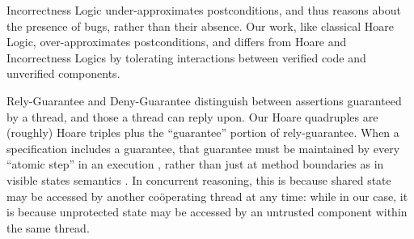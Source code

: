  Incorrectness Logic
\cite{IncorrectnessLogic}
under-approximates  postconditions, and thus
reasons about the presence of bugs, rather than their absence.
%
Our work, like classical Hoare Logic, over-approximates postconditions,
 and differs from Hoare and Incorrectness Logics
by tolerating interactions between verified code and unverified components.

Rely-Guarantee
\cite{relyGuarantee-HayesJones-setss2017,relyGuarantee-vanStaden-mpc2015}
and Deny-Guarantee \cite{DenyGuarantee} %
distinguish between assertions guaranteed by a thread, and those a
thread can reply upon. 
Our Hoare quadruples are (roughly) Hoare triples plus 
the ``guarantee'' portion of rely-guarantee.
When a
specification includes a guarantee, that guarantee must be maintained
by every ``atomic step'' in an execution
\cite{relyGuarantee-HayesJones-setss2017}, rather than just at method
boundaries as in visible states semantics
\cite{MuellerPoetzsch-HeffterLeavens06,DrossoFrancaMuellerSummers08,considerate}.
In concurrent reasoning,  
this is because shared state may be accessed
by another co{\"o}perating thread at any time:
while in our case, it is because unprotected
state may be accessed by an untrusted component within the same
thread.  

